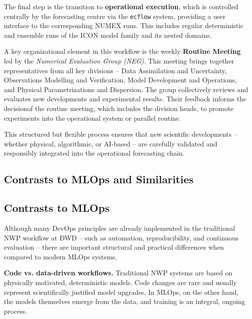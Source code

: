 The final step is the transition to {\bf operational execution}, which is controlled centrally by the forecasting centre via the {\tt ecflow} system, providing a user interface to the corresponding NUMEX runs. This includes regular deterministic and ensemble runs of the ICON model family and its nested domains.

A key organizational element in this workflow is the weekly {\bf Routine Meeting} led by the {\em Numerical Evaluation Group (NEG)}. This meeting brings together representatives from all key divisions -- Data Assimilation and Uncertainty, Observations Modelling and Verification, Model Development and Operations, and Physical Parametrizations and Dispersion. The group collectively reviews and evaluates new developments and experimental results. Their feedback informs the decisionof the routine meeting, which includes the division heads, to promote experiments into the operational system or parallel routine.

This structured but flexible process ensures that new scientific developments -- whether physical, algorithmic, or AI-based -- are carefully validated and responsibly integrated into the operational forecasting chain.


%
\subsection{Contrasts to MLOps and Similarities}

%
\subsection{Contrasts to MLOps}

Although many DevOps principles are already implemented in the traditional NWP workflow at DWD -- such as automation, reproducibility, and continuous evaluation -- there are important structural and practical differences when compared to modern MLOps systems.

{\bf Code vs. data-driven workflows.} Traditional NWP systems are based on physically motivated, deterministic models. Code changes are rare and usually represent scientifically justified model upgrades. In MLOps, on the other hand, the models themselves emerge from the data, and training is an integral, ongoing process.

